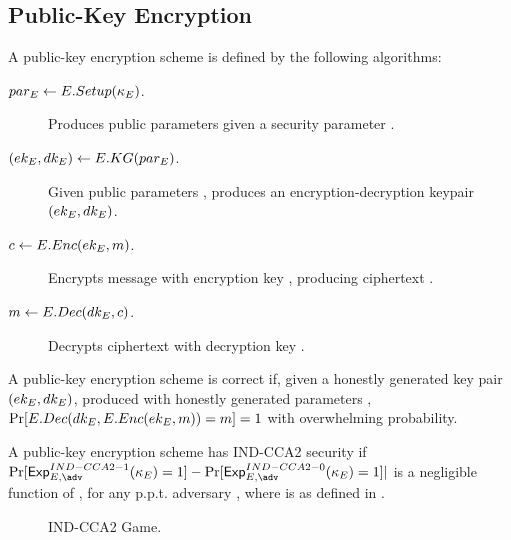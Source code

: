 \subsection{Public-Key Encryption}
\label{sapp:pk-encryption}

A public-key encryption scheme is defined by the following algorithms:

\begin{description}
\item[$par_{E} \gets E.Setup(\kappa_{E})$.] Produces public parameters \Eparm given
  a security parameter \Esecpar.
\item[$(ek_{E},dk_{E}) \gets E.KG(par_{E})$.] Given public parameters \Eparm,
  produces an encryption-decryption keypair $(ek_{E},dk_{E})$.
\item[$c \gets E.Enc(ek_{E},m)$.] Encrypts message \msg with encryption key
  \Eek, producing ciphertext \Ec.
\item[$m \gets E.Dec(dk_{E},c)$.] Decrypts ciphertext \Ec with decryption key
  \Edk.
\end{description}

A public-key encryption scheme is correct if, given a honestly generated key
pair $(ek_{E},dk_{E})$, produced with honestly generated parameters \Eparm,
$\Pr[E.Dec(dk_{E},E.Enc(ek_{E},m))=m] = 1$ with overwhelming probability.

A public-key encryption scheme has IND-CCA2 security if
$\Pr[\ExpINDCCAiio(\Esecpar) = 1] - \Pr[\ExpINDCCAiiz(\Esecpar) = 1]|$ is
a negligible function of \Esecpar, for any p.p.t. adversary \adv, where
\ExpINDCCAiib is as defined in .

\begin{figure}[ht!]
  \begin{minipage}[t]{\textwidth}
    \centering      
  \end{minipage}
  \label{fig:indcca2-game}
  \caption{IND-CCA2 Game.}
\end{figure}

